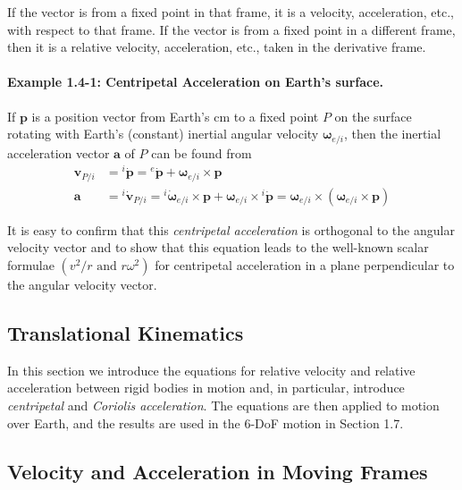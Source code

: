 If the vector is from a fixed point in that frame, it is a velocity, acceleration, etc., with respect to that frame. If the vector is from a fixed point in a different frame, then it is a relative velocity, acceleration, etc., taken in the derivative frame.

\paragraph{Example 1.4-1: Centripetal Acceleration on Earth's surface.} If \(\mathbf{p}\) is a position vector from Earth's cm to a fixed point \(P\) on the surface rotating with Earth's (constant) inertial angular velocity \(\mathbf{\omega}_{e\!/\!i}\), then the inertial acceleration vector \(\mathbf{a}\) of \(P\) can be found from
\begin{align*}
\mathbf{v}_{P/i} &= {^{i}\dot{\mathbf{p}}} = {^{e}\dot{\mathbf{p}}} + \mathbf{\omega}_{e/i}\!\times\!\mathbf{p} \\
\mathbf{a} &= {^{i}\dot{\mathbf{v}}_{P/i}} = {^{i}\dot{\mathbf{\omega}}_{e/i}} \! \times \! \mathbf{p} + \mathbf{\omega}_{e/i} \! \times {^{i}\dot{\mathbf{p}}} = \mathbf{\omega}_{e/i} \! \times \! \left(\mathbf{\omega}_{e/i}\!\times\!\mathbf{p}\right) \tag{1}
\end{align*}

It is easy to confirm that this \textit{centripetal acceleration} is orthogonal to the angular velocity vector and to show that this equation leads to the well-known scalar formulae \( \left(v^{2}/r \text{ and } r \omega^{2} \right) \) for centripetal acceleration in a plane perpendicular to the angular velocity vector.

\subsection{Translational Kinematics}

In this section we introduce the equations for relative velocity and relative acceleration between rigid bodies in motion and, in particular, introduce \textit{centripetal} and \textit{Coriolis acceleration}. The equations are then applied to motion over Earth, and the results are used in the 6-DoF motion in Section 1.7.

\subsection{Velocity and Acceleration in Moving Frames}

